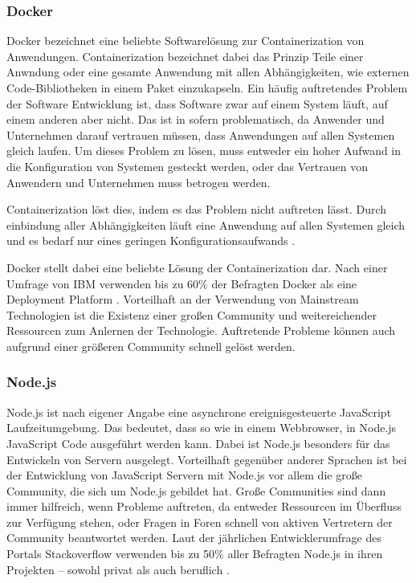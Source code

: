 \subsubsection*{Docker}
Docker bezeichnet eine beliebte Softwarelösung zur Containerization von Anwendungen.
Containerization bezeichnet dabei das Prinzip Teile einer Anwndung oder eine gesamte Anwendung mit allen Abhängigkeiten, wie externen Code-Bibliotheken in einem Paket einzukapseln.
Ein häufig auftretendes Problem der Software Entwicklung ist, dass Software zwar auf einem System läuft, auf einem anderen aber nicht.
Das ist in sofern problematisch, da Anwender und Unternehmen darauf vertrauen müssen, dass Anwendungen auf allen Systemen gleich laufen.
Um dieses Problem zu lösen, muss entweder ein hoher Aufwand in die Konfiguration von Systemen gesteckt werden, oder das Vertrauen von Anwendern und Unternehmen muss betrogen werden.

Containerization löst dies, indem es das Problem nicht auftreten lässt.
Durch einbindung aller Abhängigkeiten läuft eine Anwendung auf allen Systemen gleich und es bedarf nur eines geringen Konfigurationsaufwands \autocite{B_IBMCloudEducation.2019}.

Docker stellt dabei eine beliebte Lösung der Containerization dar.
Nach einer Umfrage von IBM verwenden bis zu 60\% der Befragten Docker als eine Deployment Platform \autocite{B_IBMCloud.}.
Vorteilhaft an der Verwendung von Mainstream Technologien ist die Existenz einer großen Community und weitereichender Ressourcen zum Anlernen der Technologie.
Auftretende Probleme können auch aufgrund einer größeren Community schnell gelöst werden. 

\subsubsection*{Node.js}
Node.js ist nach eigener Angabe eine asynchrone ereignisgesteuerte JavaScript Laufzeitumgebung. \autocite{Node.js.}
Das bedeutet, dass so wie in einem Webbrowser, in Node.js JavaScript Code ausgeführt werden kann.
Dabei ist Node.js besonders für das Entwickeln von Servern ausgelegt.
Vorteilhaft gegenüber anderer Sprachen ist bei der Entwicklung von JavaScript Servern mit Node.js vor allem die große Community, die sich um Node.js gebildet hat.
Große Communities sind dann immer hilfreich, wenn Probleme auftreten, da entweder Ressourcen im Überfluss zur Verfügung stehen, oder Fragen in Foren schnell von aktiven Vertretern der Community beantwortet werden.
Laut der jährlichen Entwicklerumfrage des Portals Stackoverflow verwenden bis zu 50\% aller Befragten Node.js in ihren Projekten -- sowohl privat als auch beruflich \autocite{B_Stackoverflow.2020}.

